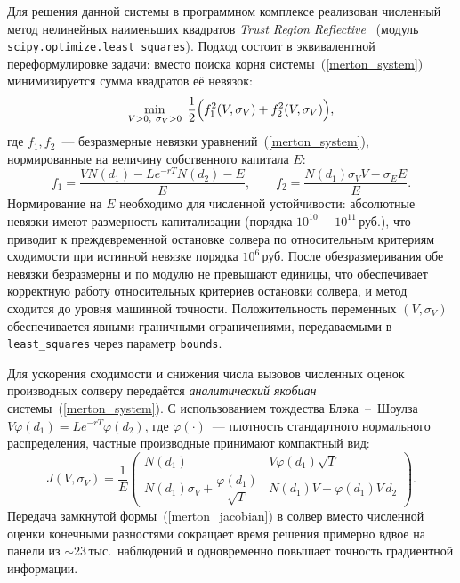 \documentclass[]{article}
\begin{document}
	Для решения данной системы в программном комплексе реализован численный метод
	нелинейных наименьших квадратов \emph{Trust Region Reflective}~\cite{conn2000trust}
	(модуль \texttt{scipy.optimize.least\_squares}). Подход состоит в эквивалентной
	переформулировке задачи: вместо поиска корня системы~(\ref{merton_system})
	минимизируется сумма квадратов её невязок:
	\begin{equation}
		\label{merton_lsq}
		\min_{V > 0,\ \sigma_V > 0}
		\;\frac{1}{2}\Bigl(f_1^2(V, \sigma_V) + f_2^2(V, \sigma_V)\Bigr),
	\end{equation}
	где $f_1, f_2$~--- безразмерные невязки уравнений~(\ref{merton_system}),
	нормированные на величину собственного капитала $E$:
	\[
		f_1 = \frac{V N(d_1) - L e^{-rT} N(d_2) - E}{E},\qquad
		f_2 = \frac{N(d_1) \sigma_V V - \sigma_E E}{E}.
	\]
	Нормирование на $E$ необходимо для численной устойчивости: абсолютные невязки
	имеют размерность капитализации (порядка $10^{10}$\,---\,$10^{11}$\,руб.),
	что приводит к преждевременной остановке солвера по относительным критериям
	сходимости при истинной невязке порядка $10^{6}$\,руб. После обезразмеривания
	обе невязки безразмерны и по модулю не превышают единицы, что обеспечивает
	корректную работу относительных критериев остановки солвера, и метод сходится
	до уровня машинной точности.
	Положительность переменных $(V, \sigma_V)$ обеспечивается явными граничными
	ограничениями, передаваемыми в \texttt{least\_squares} через параметр
	\texttt{bounds}.

	Для ускорения сходимости и снижения числа вызовов численных оценок производных
	солверу передаётся \emph{аналитический якобиан} системы~(\ref{merton_system}).
	С использованием тождества Блэка~--~Шоулза $V \varphi(d_1) = L e^{-rT} \varphi(d_2)$,
	где $\varphi(\cdot)$~--- плотность стандартного нормального распределения,
	частные производные принимают компактный вид:
	\begin{equation}
		\label{merton_jacobian}
		J(V, \sigma_V) = \frac{1}{E}
		\begin{pmatrix}
			N(d_1) & V \varphi(d_1) \sqrt{T} \\[4pt]
			N(d_1) \sigma_V + \dfrac{\varphi(d_1)}{\sqrt{T}}
			& N(d_1) V - \varphi(d_1) V\, d_2
		\end{pmatrix}.
	\end{equation}
	Передача замкнутой формы~(\ref{merton_jacobian}) в солвер вместо численной
	оценки конечными разностями сокращает время решения примерно вдвое на
	панели из $\sim$23\,тыс.~наблюдений и одновременно повышает точность
	градиентной информации.
\end{document}
